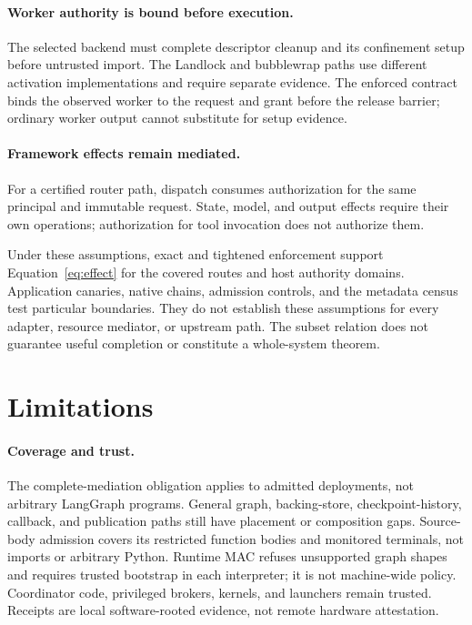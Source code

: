 \documentclass[letterpaper,twocolumn,10pt]{article}
\begin{document}
\paragraph{Worker authority is bound before execution.}
The selected backend must complete descriptor cleanup and its confinement
setup before untrusted import. The Landlock and bubblewrap paths use different
activation implementations and require separate evidence. The enforced contract
binds the observed worker to the request and grant before the release barrier;
ordinary worker output cannot substitute for setup evidence.

\paragraph{Framework effects remain mediated.}
For a certified router path, dispatch consumes authorization for the same
principal and immutable request. State, model, and output effects require their
own operations; authorization for tool invocation does not authorize them.

Under these assumptions, exact and tightened enforcement support
Equation~\ref{eq:effect} for the covered routes and host authority domains.
Application canaries, native chains, admission controls, and the metadata census
test particular boundaries. They do not establish these assumptions for every
adapter, resource mediator, or upstream path. The subset relation does not
guarantee useful completion or constitute a whole-system theorem.



\section{Limitations}
\label{sec:limitations}

\paragraph{Coverage and trust.}
The complete-mediation obligation applies to admitted deployments, not arbitrary
LangGraph programs. General graph, backing-store, checkpoint-history, callback,
and publication paths still have placement or composition gaps. Source-body
admission covers its restricted function bodies and monitored terminals, not
imports or arbitrary Python. Runtime MAC refuses unsupported graph shapes and
requires trusted bootstrap in each interpreter; it is not machine-wide policy.
Coordinator code, privileged brokers, kernels, and launchers remain trusted.
Receipts are local software-rooted evidence, not remote hardware attestation.
\end{document}
